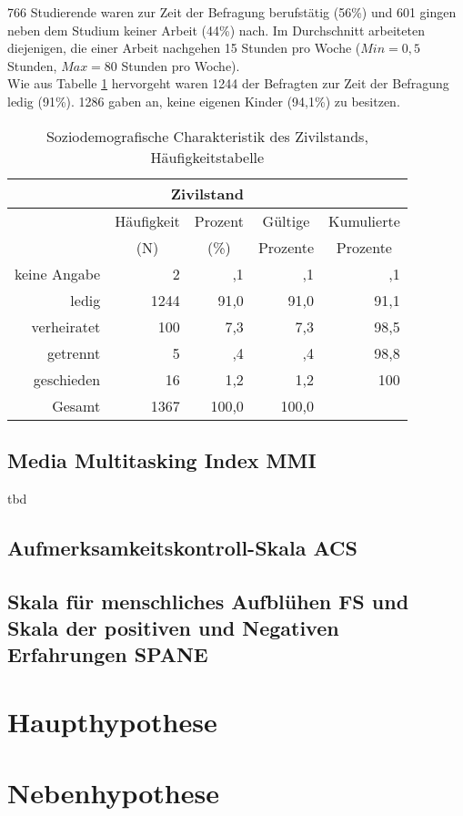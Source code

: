 766 Studierende waren zur Zeit der Befragung berufstätig (56\%) und 601 gingen neben dem Studium keiner Arbeit (44\%) nach. Im Durchschnitt arbeiteten diejenigen, die einer Arbeit nachgehen 15 Stunden pro Woche ($Min = 0,5$ Stunden, $Max = 80$ Stunden pro Woche).\\
Wie aus Tabelle \ref{table.sozidemoZivil} hervorgeht waren 1244 der Befragten zur Zeit der Befragung ledig (91\%). 1286 gaben an, keine eigenen Kinder (94,1\%) zu besitzen.
\begin{table}[ht] 
    \centering
    \caption{Soziodemografische Charakteristik des Zivilstands, Häufigkeitstabelle}
    \begin{tabular}[t]{|r|r|r|r|r|} 
        \hline
        \multicolumn{5}{|c|}{\textbf{Zivilstand}}\\ 
        \hline       
        \multicolumn{1}{|c}{} & \multicolumn{1}{c|}{Häufigkeit} & \multicolumn{1}{|c|}{Prozent} & \multicolumn{1}{|c|}{Gültige} & \multicolumn{1}{|c|}{Kumulierte}\\
        \multicolumn{1}{|c}{} & \multicolumn{1}{c|}{(N)} & \multicolumn{1}{|c|}{(\%)} & \multicolumn{1}{|c|}{Prozente} & \multicolumn{1}{|c|}{Prozente} \\
        \hline
        keine Angabe & 2 & ,1 & ,1 & ,1\\
        ledig & 1244 & 91,0 & 91,0 & 91,1\\
        verheiratet & 100 & 7,3 & 7,3 & 98,5\\
        getrennt & 5 & ,4 & ,4 & 98,8\\
        geschieden & 16 & 1,2 & 1,2 & 100\\
        Gesamt  & 1367 & 100,0 & 100,0 & \\
        \hline
    \end{tabular}
    \label{table.sozidemoZivil}
\end{table}
\subsection{Media Multitasking Index MMI}
tbd
\subsection{Aufmerksamkeitskontroll-Skala ACS}
\subsection{Skala für menschliches Aufblühen FS und Skala der positiven und Negativen Erfahrungen SPANE}


\section{Haupthypothese}\label{label.haupthypothese}
\section{Nebenhypothese}\label{label.nebenhypothese}


